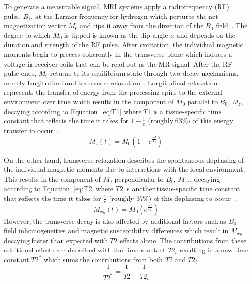 To generate a measurable signal, MRI systems apply a radiofrequency (RF) pulse, $B_1$, at the Larmor frequency for hydrogen which perturbs the net magnetization vector $M_0$ and tips it away from the direction of the $B_0$ field~\cite{mamourianPracticalMRPhysics2010}. The degree to which $M_0$ is tipped is known as the flip angle $\alpha$ and depends on the duration and strength of the RF pulse. After excitation, the individual magnetic moments begin to precess coherently in the transverse plane which induces a voltage in receiver coils that can be read out as the MR signal. After the RF pulse ends, $M_0$ returns to its equilibrium state through two decay mechanisms, namely longitudinal and transverse relaxation~\cite{mamourianPracticalMRPhysics2010}. Longitudinal relaxation represents the transfer of energy from the precessing spins to the external environment over time which results in the component of $M_0$ parallel to $B_0$, $M_z$, decaying according to Equation~\ref{eq:T1} where $T1$ is a tissue-specific time constant that reflects the time it takes for $1-\frac{1}{e}$ (roughly 63\%) of this energy transfer to occur~\cite{mamourianPracticalMRPhysics2010}.
\begin{equation}
    M_z(t)=M_0\left(1-e^\frac{-t}{T_1}\right)
    \label{eq:T1}
\end{equation}

On the other hand, transverse relaxation describes the spontaneous dephasing of the individual magnetic moments due to interactions with the local environment. This results in the component of $M_0$ perpendicular to $B_0$, $M_{xy}$, decaying according to Equation~\ref{eq:T2} where $T2$ is another tissue-specific time constant that reflects the time it takes for $\frac{1}{e}$ (roughly 37\%) of this dephasing to occur~\cite{mamourianPracticalMRPhysics2010}.
\begin{equation}
    M_{xy}(t)=M_0\left(e^\frac{-t}{T_2}\right) 
    \label{eq:T2}
\end{equation}
However, the transverse decay is also affected by additional factors such as $B_0$ field inhomogeneities and magnetic susceptibility differences which result in $M_{xy}$ decaying faster than expected with $T2$ effects alone. The contributions from these additional effects are described with the time-constant $T2_i$ resulting in a new time constant $T2^*$ which sums the contributions from both $T2$ and $T2_i$~\cite{mamourianPracticalMRPhysics2010}.
\begin{equation}
    \frac{1}{T2^*}=\frac{1}{T2}+\frac{1}{T2_i}
    \label{eq:T2*}
\end{equation}

